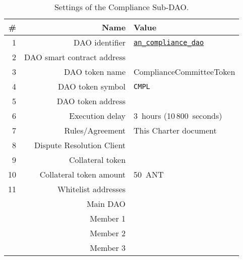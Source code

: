 \begin{table}[h!]
	\caption{Settings of the Compliance Sub-DAO.}
	\centering
	\begin{tabular}{rrl}
		\toprule
		\# & Name & Value \\
		\midrule
		1 & \ac{DAO} identifier & \href{https://govern.aragon.org/\#/daos/an_compliance_dao}{\texttt{an\_compliance\_dao}}\\
		2 & \ac{DAO} smart contract address & \cmplSubDaoAddr\\
		3 & \ac{DAO} token name & ComplianceCommitteeToken\\
		4 & \ac{DAO} token symbol & \texttt{CMPL}\\
		5 & \ac{DAO} token address & \cmplSubDaoTokenAddr\\
		6 & Execution delay & 3~hours (10\,800~seconds)\\
		7 & Rules/Agreement & This Charter document\\
		8 & Dispute Resolution Client & \aragonCourtAddr\\
		9 & Collateral token & \antTokenAddr\\
		10 & Collateral token amount & 50~\ac{ANT}\\
		11 & Whitelist addresses \\
		& Main \ac{DAO} & \mainDaoAddr\\
		& Member 1 & \cmplSubDaoMemberAddrI\\
		& Member 2 & \cmplSubDaoMemberAddrII\\
		& Member 3 & \cmplSubDaoMemberAddrIII\\
		\bottomrule
	\end{tabular}
\end{table}

